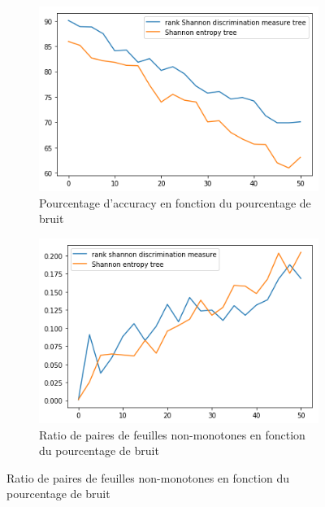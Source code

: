\documentclass[a4paper]{article}
\begin{document}
\begin{figure}[H]
    \centering
    \begin{subfigure}[c]{0.46\textwidth}
        \centering
        \includegraphics[width=\textwidth]{images/cci_3.png}
        \caption{Pourcentage d'accuracy en fonction du pourcentage de bruit}
    \label{subresults:acc3}
    \end{subfigure}
    \begin{subfigure}[c]{0.46\textwidth}
        \centering
        \includegraphics[width=\textwidth]{images/ratio_3.png}
        \caption{Ratio de paires de feuilles non-monotones en fonction du pourcentage de bruit}
    \label{subresults:ratio3}
    \end{subfigure}
    

\end{figure}
\end{document}
